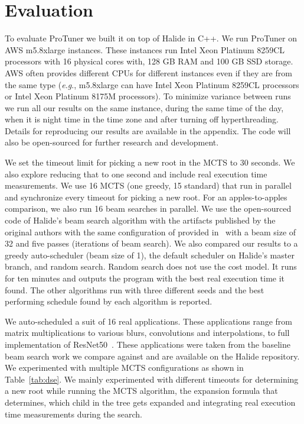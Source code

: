 \section{Evaluation}
\label{sec:res}



To evaluate ProTuner we built it on top of Halide in C++. We run ProTuner on AWS m5.8xlarge instances. These instances run Intel Xeon Platinum 8259CL processors with 16 physical cores with, 128 GB RAM and 100 GB SSD storage. AWS often provides different CPUs for different instances even if they are from the same type (\textit{e.g}., m5.8xlarge can have Intel Xeon Platinum 8259CL processors or Intel Xeon Platinum 8175M processors). To minimize variance between runs we run all our results on the same instance, during the same time of the day, when it is night time in the time zone and after turning off hyperthreading. Details for reproducing our results are available in the appendix. The code will also be open-sourced for further research and development.

We set the timeout limit for picking a new root in the MCTS to 30 seconds. We also explore reducing that to one second and include real execution time measurements. We use 16 MCTS (one greedy, 15 standard) that run in parallel and synchronize every timeout for picking a new root. For an apples-to-apples comparison, we also run 16 beam searches in parallel. We use the open-sourced code of Halide's beam search algorithm with the artifacts published by the original authors with the same configuration of provided in~\cite{adams2019learning} with a beam size of 32 and five passes (iterations of beam search). We also compared our results to a greedy auto-scheduler (beam size of 1), the default scheduler on Halide's master branch, and random search. Random search does not use the cost model. It runs for ten minutes and outputs the program with the best real execution time it found. The other algorithms run with three different seeds and the best performing schedule found by each algorithm is reported. 

We auto-scheduled a suit of 16 real applications. These applications range from matrix multiplications to various blurs, convolutions and interpolations, to full implementation of ResNet50~\cite{he2016deep}. These applications were taken from the baseline beam search work we compare against and are available on the Halide repository. We experimented with multiple MCTS configurations as shown in Table~\ref{tab:dse}. We mainly experimented with different timeouts for determining a new root while running the MCTS algorithm, the expansion formula that determines, which child in the tree gets expanded and integrating real execution time measurements during the search. 


